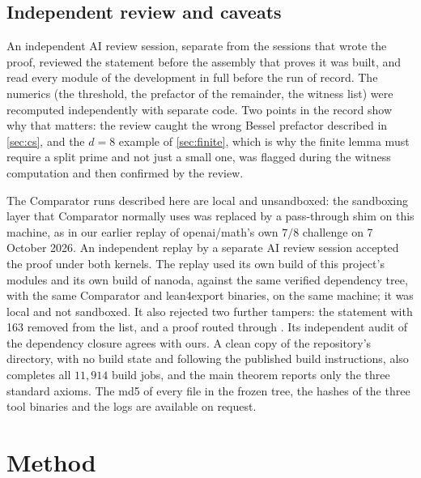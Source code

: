 \documentclass[11pt]{article}
\theoremstyle{definition}
\begin{document}
\subsection{Independent review and caveats}\label{sec:caveats}

An independent AI review session, separate from the sessions that wrote the proof, reviewed the statement before the assembly that proves it was built, and read every module of the development in full before the run of record. The numerics (the threshold, the prefactor of the remainder, the witness list) were recomputed independently with separate code. Two points in the record show why that matters: the review caught the wrong Bessel prefactor described in \cref{sec:cs}, and the $d = 8$ example of \cref{sec:finite}, which is why the finite lemma must require a split prime and not just a small one, was flagged during the witness computation and then confirmed by the review.

The Comparator runs described here are local and unsandboxed: the sandboxing layer that Comparator normally uses was replaced by a pass-through shim on this machine, as in our earlier replay of openai/math's own $7/8$ challenge on 7 October 2026. An independent replay by a separate AI review session accepted the proof under both kernels. The replay used its own build of this project's modules and its own build of nanoda, against the same verified dependency tree, with the same Comparator and lean4export binaries, on the same machine; it was local and not sandboxed. It also rejected two further tampers: the statement with 163 removed from the list, and a proof routed through . Its independent audit of the dependency closure agrees with ours. A clean copy of the repository's  directory, with no build state and following the published build instructions, also completes all $11{,}914$ build jobs, and the main theorem reports only the three standard axioms. The md5 of every file in the frozen tree, the hashes of the three tool binaries and the logs are available on request.

\section{Method}\label{sec:method}
\end{document}
